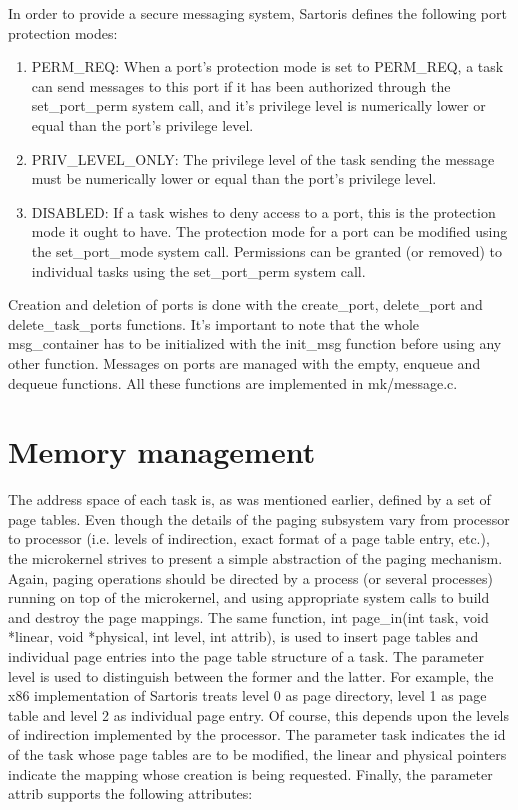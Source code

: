 \documentclass[11pt, letterpaper, twoside, english]{book}
\begin{document}
In order to provide a secure messaging system, Sartoris defines the following port protection modes:
\begin{enumerate}
\item[]\textsf{PERM\_REQ}: When a port's protection mode is set to \textsf{PERM\_REQ}, a task can send messages to this port if it has been authorized through the \textsf{set\_port\_perm} system call, and it's privilege level is numerically lower or equal than the port's privilege level.
\item[]\textsf{PRIV\_LEVEL\_ONLY}: The privilege level of the task sending the message must be numerically lower or equal than the port's privilege level.
\item[]\textsf{DISABLED}: If a task wishes to deny access to a port, this is the protection mode it ought to have.
The protection mode for a port can be modified using the \textsf{set\_port\_mode} system call. Permissions can be granted (or removed) to individual tasks using the \textsf{set\_port\_perm} system call.
\end{enumerate} 

Creation and deletion of ports is done with the \textsf{create\_port}, \textsf{delete\_port} and \textsf{delete\_task\_ports} functions. It's important to note that the whole \textsf{msg\_container} has to be initialized with the \textsf{init\_msg} function before using any other function. Messages on ports are managed with the \textsf{empty}, \textsf{enqueue} and \textsf{dequeue} functions. All these functions are implemented in \textsf{mk/message.c}.

\section{Memory management} \label{sec:memorymanagement}

The address space of each task is, as was mentioned earlier, defined by a set of page tables. Even though the details of the paging subsystem vary from processor to processor (i.e. levels of indirection, exact format of a page table entry, etc.), the microkernel strives to present a simple abstraction of the paging mechanism. Again, paging operations should be directed by a process (or several processes) running on top of the microkernel, and using appropriate system calls to build and destroy the page mappings. The same function, \textsf{int page\_in(int task, void *linear, void *physical, int level, int attrib)}, is used to insert page tables and individual page entries into the page table structure of a task. The parameter \textsf{level} is used to distinguish between the former and the latter. For example, the x86 implementation of Sartoris treats level 0 as page directory, level 1 as page table and level 2 as individual page entry. Of course, this depends upon the levels of indirection implemented by the processor. The parameter \textsf{task} indicates the id of the task whose page tables are to be modified, the \textsf{linear} and \textsf{physical} pointers indicate the mapping whose creation is being requested. Finally, the parameter \textsf{attrib} supports the following attributes:
\end{document}
